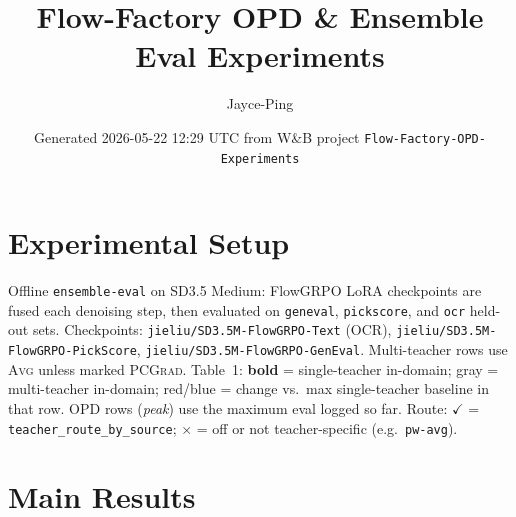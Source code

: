\documentclass[11pt]{article}
\title{Flow-Factory OPD \& Ensemble Eval Experiments}
\author{Jayce-Ping}
\date{Generated 2026-05-22 12:29 UTC from W\&B project \texttt{Flow-Factory-OPD-Experiments}}
\begin{document}
\maketitle

\section{Experimental Setup}

\begin{sloppypar}
Offline \texttt{ensemble-eval} on SD3.5 Medium: FlowGRPO LoRA checkpoints
are fused each denoising step, then evaluated on \texttt{geneval},
\texttt{pickscore}, and \texttt{ocr} held-out sets.
Checkpoints: \texttt{jieliu/SD3.5M-FlowGRPO-Text} (OCR),
\texttt{jieliu/SD3.5M-FlowGRPO-PickScore},
\texttt{jieliu/SD3.5M-FlowGRPO-GenEval}.
Multi-teacher rows use \textsc{Avg} unless marked \textsc{PCGrad}.
Table~1: \textbf{bold} = single-teacher in-domain; gray = multi-teacher
in-domain; red/blue = change vs.\ max single-teacher baseline in that row.
OPD rows (\textit{peak}) use the maximum eval logged so far.
Route: $\checkmark$ = \texttt{teacher\_route\_by\_source}; $\times$ = off or not teacher-specific (e.g.\ \texttt{pw-avg}).
\end{sloppypar}

\section{Main Results}
\end{document}
